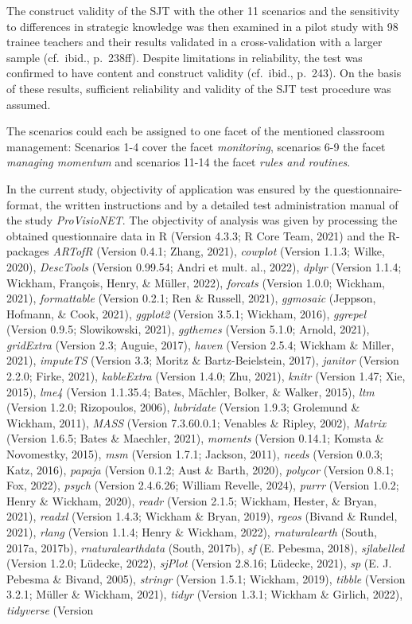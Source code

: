 \documentclass[
  man]{apa6}
\begin{document}
The construct validity of the SJT with the other 11 scenarios and the sensitivity to differences in strategic knowledge was then examined in a pilot study with 98 trainee teachers and their results validated in a cross-validation with a larger sample (cf.~ibid., p.~238ff). Despite limitations in reliability, the test was confirmed to have content and construct validity (cf.~ibid., p.~243). On the basis of these results, sufficient reliability and validity of the SJT test procedure was assumed.

The scenarios could each be assigned to one facet of the mentioned classroom management: Scenarios 1-4 cover the facet \emph{monitoring}, scenarios 6-9 the facet \emph{managing momentum} and scenarios 11-14 the facet \emph{rules and routines}.

In the current study, objectivity of application was ensured by the questionnaire-format, the written instructions and by a detailed test administration manual of the study \emph{ProVisioNET}. The objectivity of analysis was given by processing the obtained questionnaire data in R (Version 4.3.3; R Core Team, 2021) and the R-packages \emph{ARTofR} (Version 0.4.1; Zhang, 2021), \emph{cowplot} (Version 1.1.3; Wilke, 2020), \emph{DescTools} (Version 0.99.54; Andri et mult. al., 2022), \emph{dplyr} (Version 1.1.4; Wickham, François, Henry, \& Müller, 2022), \emph{forcats} (Version 1.0.0; Wickham, 2021), \emph{formattable} (Version 0.2.1; Ren \& Russell, 2021), \emph{ggmosaic} (Jeppson, Hofmann, \& Cook, 2021), \emph{ggplot2} (Version 3.5.1; Wickham, 2016), \emph{ggrepel} (Version 0.9.5; Slowikowski, 2021), \emph{ggthemes} (Version 5.1.0; Arnold, 2021), \emph{gridExtra} (Version 2.3; Auguie, 2017), \emph{haven} (Version 2.5.4; Wickham \& Miller, 2021), \emph{imputeTS} (Version 3.3; Moritz \& Bartz-Beielstein, 2017), \emph{janitor} (Version 2.2.0; Firke, 2021), \emph{kableExtra} (Version 1.4.0; Zhu, 2021), \emph{knitr} (Version 1.47; Xie, 2015), \emph{lme4} (Version 1.1.35.4; Bates, Mächler, Bolker, \& Walker, 2015), \emph{ltm} (Version 1.2.0; Rizopoulos, 2006), \emph{lubridate} (Version 1.9.3; Grolemund \& Wickham, 2011), \emph{MASS} (Version 7.3.60.0.1; Venables \& Ripley, 2002), \emph{Matrix} (Version 1.6.5; Bates \& Maechler, 2021), \emph{moments} (Version 0.14.1; Komsta \& Novomestky, 2015), \emph{msm} (Version 1.7.1; Jackson, 2011), \emph{needs} (Version 0.0.3; Katz, 2016), \emph{papaja} (Version 0.1.2; Aust \& Barth, 2020), \emph{polycor} (Version 0.8.1; Fox, 2022), \emph{psych} (Version 2.4.6.26; William Revelle, 2024), \emph{purrr} (Version 1.0.2; Henry \& Wickham, 2020), \emph{readr} (Version 2.1.5; Wickham, Hester, \& Bryan, 2021), \emph{readxl} (Version 1.4.3; Wickham \& Bryan, 2019), \emph{rgeos} (Bivand \& Rundel, 2021), \emph{rlang} (Version 1.1.4; Henry \& Wickham, 2022), \emph{rnaturalearth} (South, 2017a, 2017b), \emph{rnaturalearthdata} (South, 2017b), \emph{sf} (E. Pebesma, 2018), \emph{sjlabelled} (Version 1.2.0; Lüdecke, 2022), \emph{sjPlot} (Version 2.8.16; Lüdecke, 2021), \emph{sp} (E. J. Pebesma \& Bivand, 2005), \emph{stringr} (Version 1.5.1; Wickham, 2019), \emph{tibble} (Version 3.2.1; Müller \& Wickham, 2021), \emph{tidyr} (Version 1.3.1; Wickham \& Girlich, 2022), \emph{tidyverse} (Version 
\end{document}
